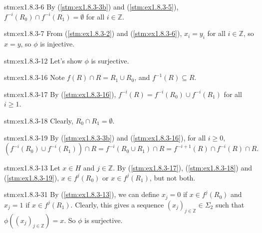 \begin{statement}{stm:ex1.8.3-6}
By (\ref{stm:ex1.8.3-3b}) and (\ref{stm:ex1.8.3-5}), $f^{-i}(R_0) \cap f^{-i}(R_1) = \emptyset$ for all $i \in \mathbb{Z}$.
\end{statement}

\begin{statement}{stm:ex1.8.3-7}
From (\ref{stm:ex1.8.3-2}) and (\ref{stm:ex1.8.3-6}), $x_i = y_i$ for all $i \in \mathbb{Z}$, so $x = y$, so $\phi$ is injective.
\end{statement}

\begin{explanation}{stm:ex1.8.3-12}
Let's show $\phi$ is surjective.
\end{explanation}

\begin{statement}{stm:ex1.8.3-16}
Note $f(R) \cap R = R_1 \cup R_0$, and $f^{-1}(R) \subseteq R$.
\end{statement}

\begin{statement}{stm:ex1.8.3-17}
By (\ref{stm:ex1.8.3-16}), $f^{-i}(R) = f^{-i}(R_0) \cup f^{-i}(R_1)$ for all $i \geq 1$.
\end{statement}

\begin{statement}{stm:ex1.8.3-18}
Clearly, $R_0 \cap R_1 = \emptyset$.
\end{statement}

\begin{statement}{stm:ex1.8.3-19}
By (\ref{stm:ex1.8.3-3b}) and (\ref{stm:ex1.8.3-16}), for all $i \ge 0$,
\[
\left(f^{-i}(R_0) \cup f^{-i}(R_1)\right) \cap R = f^{-i}(R_0 \cup R_1) \cap R = f^{-i+1}(R) \cap f^{-i}(R) \cap R.
\]
\end{statement}

\begin{statement}{stm:ex1.8.3-13}
Let $x \in H$ and $j \in \mathbb{Z}$. By (\ref{stm:ex1.8.3-17}), (\ref{stm:ex1.8.3-18}) and (\ref{stm:ex1.8.3-19}), $x \in f^j(R_0)$ or $x \in f^j(R_1)$, but not both.
\end{statement}

\begin{statement}{stm:ex1.8.3-31}
By (\ref{stm:ex1.8.3-13}), we can define $x_j = 0$ if $x \in f^j(R_0)$ and $x_j = 1$ if $x \in f^j(R_1)$.  Clearly, this gives a sequence $(x_j)_{j \in \mathbb{Z}} \in \Sigma_2$ such that $\phi((x_j)_{j \in \mathbb{Z}}) = x$.
So $\phi$ is surjective.
\end{statement}


